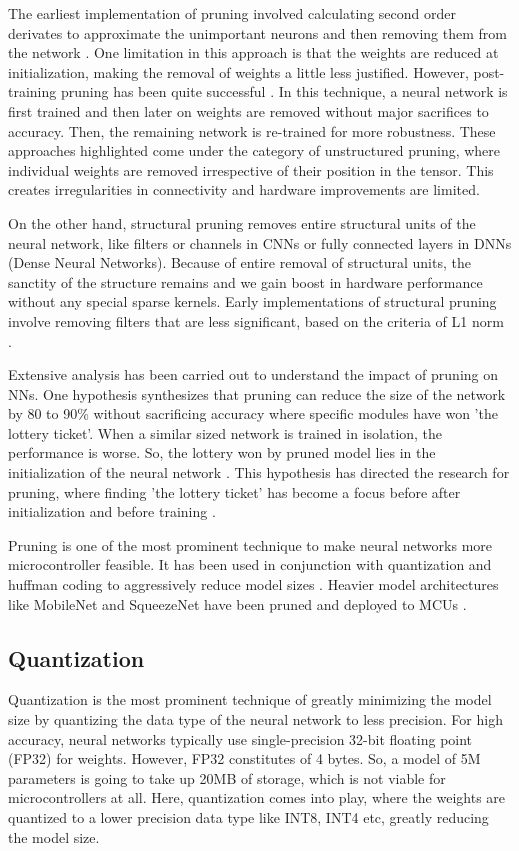 \documentclass[conference]{IEEEtran}
\begin{document}
	The earliest implementation of pruning involved calculating second order derivates to approximate the unimportant neurons and then removing them from the network \cite{pruning1990}. One limitation in this approach is that the weights are reduced at initialization, making the removal of weights a little less justified. However, post-training pruning has been quite successful \cite{pruning2015}. In this technique, a neural network is first trained and then later on weights are removed without major sacrifices to accuracy. Then, the remaining network is re-trained for more robustness. These approaches highlighted come under the category of unstructured pruning, where individual weights are removed irrespective of their position in the tensor. This creates irregularities in connectivity and hardware improvements are limited.
	
	On the other hand, structural pruning removes entire structural units of the neural network, like filters or channels in CNNs or fully connected layers in DNNs (Dense Neural Networks). Because of entire removal of structural units, the sanctity of the structure remains and we gain boost in hardware performance without any special sparse kernels. Early implementations of structural pruning involve removing filters that are less significant, based on the criteria of L1 norm \cite{structuralpruning2017}.
	
	Extensive analysis has been carried out to understand the impact of pruning on NNs. One hypothesis synthesizes that pruning can reduce the size of the network by 80 to 90\% without sacrificing accuracy where specific modules have won 'the lottery ticket'. When a similar sized network is trained in isolation, the performance is worse. So, the lottery won by pruned model lies in the initialization of the neural network \cite{lotteryhypothesis2019}. This hypothesis has directed the research for pruning, where finding 'the lottery ticket' has become a focus before after initialization and before training \cite{synflow2020}.
	
	Pruning is one of the most prominent technique to make neural networks more microcontroller feasible. It has been used in conjunction with quantization and huffman coding to aggressively reduce model sizes \cite{han2015}. Heavier model architectures like MobileNet and SqueezeNet have been pruned and deployed to MCUs \cite{lillo2024}.
	
	\subsection{Quantization}
	Quantization is the most prominent technique of greatly minimizing the model size by quantizing the data type of the neural network to less precision. For high accuracy, neural networks typically use single-precision 32-bit floating point (FP32) for weights. However, FP32 constitutes of 4 bytes. So, a model of 5M parameters is going to take up 20MB of storage, which is not viable for microcontrollers at all. Here, quantization comes into play, where the weights are quantized to a lower precision data type like INT8, INT4 etc, greatly reducing the model size.
	
\end{document}
